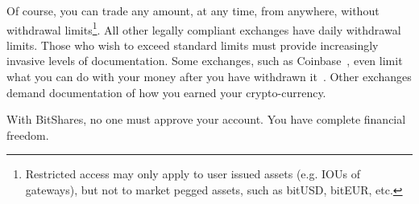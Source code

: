 Of course, you can trade any amount, at any time, from anywhere, without
withdrawal limits\footnote{Restricted access may only apply to user issued
assets (e.g. IOUs of gateways), but not to market pegged assets, such as
bitUSD, bitEUR, etc.}. All other legally compliant exchanges have daily
withdrawal limits. Those who wish to exceed standard limits must provide
increasingly invasive levels of documentation. Some exchanges, such as
Coinbase~\cite{coinbase}, even limit what you can do with your money after you
have withdrawn it~\cite{ct:compliance}. Other exchanges demand documentation of
how you earned your crypto-currency.

With BitShares, no one must approve your account. You have complete financial
freedom.
